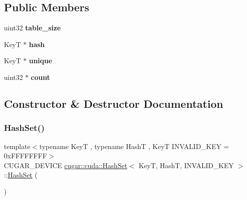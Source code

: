 \subsection*{Public Members}
\begin{DoxyCompactItemize}
\item 
\mbox{\label{structcugar_1_1cuda_1_1_hash_set_a074f287fab61cd45f89c9b0487e6a8a7}} 
uint32 {\bfseries table\+\_\+size}
\item 
\mbox{\label{structcugar_1_1cuda_1_1_hash_set_a054f48c73abd88fea5e52a788a8b5f3c}} 
KeyT $\ast$ {\bfseries hash}
\item 
\mbox{\label{structcugar_1_1cuda_1_1_hash_set_a29bb540aeaae51bdcebbdbddca1a8a02}} 
KeyT $\ast$ {\bfseries unique}
\item 
\mbox{\label{structcugar_1_1cuda_1_1_hash_set_aed55a50fc0654ba56940e9e56fe6dcc7}} 
uint32 $\ast$ {\bfseries count}
\end{DoxyCompactItemize}


\subsection{Constructor \& Destructor Documentation}
\mbox{\label{structcugar_1_1cuda_1_1_hash_set_adc0a880b09c96a8723b7caf1c9a266fa}} 
\subsubsection{\texorpdfstring{Hash\+Set()}{HashSet()}\hspace{0.1cm}{\footnotesize\ttfamily [1/2]}}
{\footnotesize\ttfamily template$<$typename KeyT , typename HashT , KeyT I\+N\+V\+A\+L\+I\+D\+\_\+\+K\+EY = 0x\+F\+F\+F\+F\+F\+F\+FF$>$ \\
C\+U\+G\+A\+R\+\_\+\+D\+E\+V\+I\+CE \hyperlink{structcugar_1_1cuda_1_1_hash_set}{cugar\+::cuda\+::\+Hash\+Set}$<$ KeyT, HashT, I\+N\+V\+A\+L\+I\+D\+\_\+\+K\+EY $>$\+::\hyperlink{structcugar_1_1cuda_1_1_hash_set}{Hash\+Set} (\begin{DoxyParamCaption}{ }\end{DoxyParamCaption})\hspace{0.3cm}{\ttfamily [inline]}}

